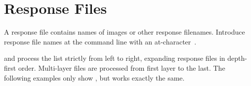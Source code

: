 

\section[Response Files\commonpart]{Response Files\commonpart
  \label{sec:response-files}
  }

A response file contains names of images or other response filenames.
Introduce response file names at the command line with an
at-character~\sample{\atsign}.%

 and  process%
%
the list  strictly from left to right, expanding
response files in depth-first order.  Multi-layer files are processed
from first layer to the last.  The following examples only show
, but  works exactly the
same.

